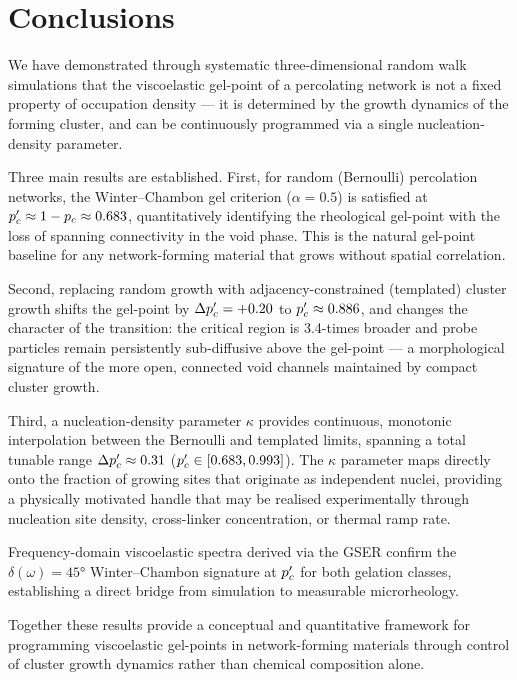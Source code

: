 \section{Conclusions}
\label{sec:conclusions}

We have demonstrated through systematic three-dimensional random walk simulations that the viscoelastic gel-point of a percolating network is not a fixed property of occupation density — it is determined by the growth dynamics of the forming cluster, and can be continuously programmed via a single nucleation-density parameter.

Three main results are established. First, for random (Bernoulli) percolation networks, the Winter--Chambon gel criterion ($\alpha = 0.5$) is satisfied at $p_c' \approx 1 - p_c \approx 0.683$, quantitatively identifying the rheological gel-point with the loss of spanning connectivity in the void phase. This is the natural gel-point baseline for any network-forming material that grows without spatial correlation.

Second, replacing random growth with adjacency-constrained (templated) cluster growth shifts the gel-point by $\Delta p_c' = +0.20$ to $p_c' \approx 0.886$, and changes the character of the transition: the critical region is 3.4-times broader and probe particles remain persistently sub-diffusive above the gel-point — a morphological signature of the more open, connected void channels maintained by compact cluster growth.

Third, a nucleation-density parameter $\kappa$ provides continuous, monotonic interpolation between the Bernoulli and templated limits, spanning a total tunable range $\Delta p_c' \approx 0.31$ ($p_c' \in [0.683, 0.993]$). The $\kappa$ parameter maps directly onto the fraction of growing sites that originate as independent nuclei, providing a physically motivated handle that may be realised experimentally through nucleation site density, cross-linker concentration, or thermal ramp rate.

Frequency-domain viscoelastic spectra derived via the GSER confirm the $\delta(\omega) = 45°$ Winter--Chambon signature at $p_c'$ for both gelation classes, establishing a direct bridge from simulation to measurable microrheology.

Together these results provide a conceptual and quantitative framework for programming viscoelastic gel-points in network-forming materials through control of cluster growth dynamics rather than chemical composition alone.

